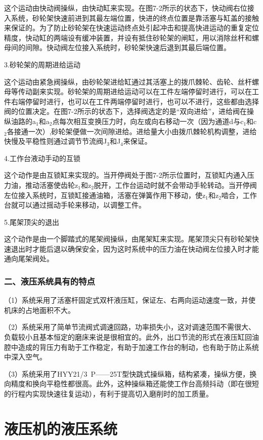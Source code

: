 这个运动由快动阀操纵，由快动缸来实现。在图7-2所示的状态下，快动阀右位接入系统，砂轮架快速前进到其最左端位置，快进的终点位置是靠活塞与缸盖的接触来保证的。为了防止砂轮架在快速运动终点处引起冲击和提高快进运动的重复定位精度，快动缸的两端设有缓冲装置，并设有抵住砂轮架的闸缸，用以消除丝杆和螺母间的间隙。快动阀左位接入系统时，砂轮架快速后退到其最后端位置。

3.砂轮架的周期进给运动

这个运动由紧急阀操纵，由砂轮架进给缸通过其活塞上的拨爪棘轮、齿轮、丝杆螺母等传动副来实现。砂轮架的周期进给运动可以在工件左端停留时进行，可以在工件右端停留时进行，也可以在工件两端停留时进行，也可以不进行，这些都由选择阀的位置决定。在图7-2所示的状态下，选择阀选定的是“双向进给”，进给阀在操纵油路的a$_1$和a$_2$点每次相互变换压力时，向左或向右移动一次（因为通道d与c$_1$和c$_2$各接通一次）,砂轮架便做一次间隙进给。进给量大小由拨爪棘轮机构调整，进给快慢及平稳性则通过调节节流阀J$_3$和J$_4$来保证。

4.工作台液动手动的互锁

这个动作是由互锁缸来实现的。当开停阀处于图7-2所示位置时，互锁缸内通入压力油，推动活塞使齿轮z$_1$和z$_2$脱开，工作台运动时就不会带动手轮转动。当开停阀左位接入系统时，互锁缸接通油箱，活塞在弹簧作用下移动，使z$_1$和z$_2$啮合，工作台就可以通过摇动手轮来移动，以调整工件。

5.尾架顶尖的退出

这个动作是由一个脚踏式的尾架阀操纵，由尾架缸来实现。尾架顶尖只有砂轮架快速退出时才能后退以确保安全，因为这时系统中的压力油在快动阀左位接入时才能通向尾架阀处。

\subsubsection*{二、液压系统具有的特点}

（1）系统采用了活塞杆固定式双杆液压缸，保证左、右两向运动速度一致，并使机床的占地面积不大。

（2）系统采用了简单节流阀式调速回路，功率损失小，这对调速范围不需很大、负载较小且基本恒定的磨床来说是很相宜的。此外，出口节流的形式在液压缸回油腔中造成的背压力有助于工作稳定，有助于加速工作台的制动，也有助于防止系统中深入空气。

（3）系统采用了HYY21/3\ P——25T型快跳式操纵箱，结构紧凑，操纵方便，换向精度和换向平稳性都很高。此外，这种操纵箱还能使工作台高频抖动（即在很短的行程内实现快速往复运动），有利于提高切入磨削时的加工质量。

\section{液压机的液压系统}


